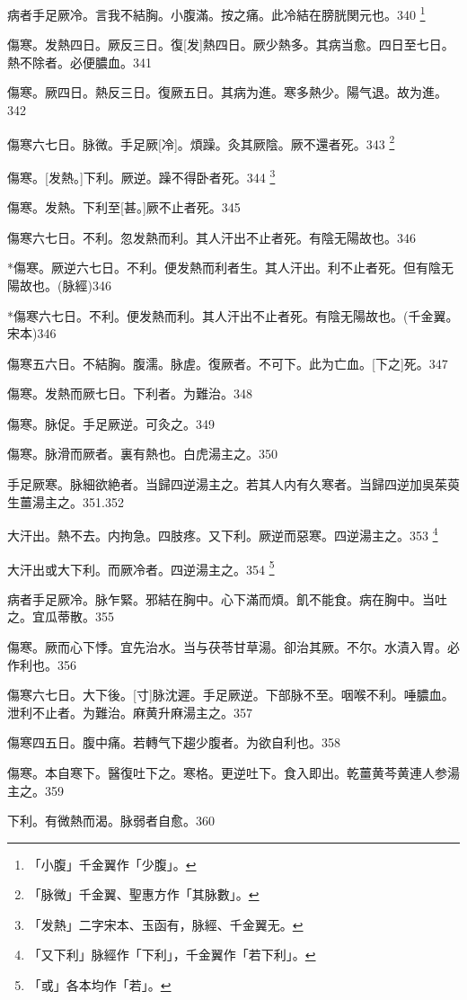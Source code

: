 \documentclass[12pt,twoside,UTF8,b5paper]{ctexbook}
\begin{document}
病者手足厥冷。言我不結胸。小腹滿。按之痛。此冷結在膀胱関元也。340
	\footnote{「小腹」千金翼作「少腹」。}

傷寒。发熱四日。厥反三日。復[发]熱四日。厥少熱多。其病当愈。四日至七日。熱不除者。必便膿血。341

傷寒。厥四日。熱反三日。復厥五日。其病为進。寒多熱少。陽气退。故为進。342

傷寒六七日。脉微。手足厥[冷]。煩躁。灸其厥陰。厥不還者死。343
	\footnote{「脉微」千金翼、聖惠方作「其脉數」。}

傷寒。[发熱。]下利。厥逆。躁不得卧者死。344
	\footnote{「发熱」二字宋本、玉函有，脉經、千金翼无。}

傷寒。发熱。下利至[甚。]厥不止者死。345

傷寒六七日。不利。忽发熱而利。其人汗出不止者死。有陰无陽故也。346

*傷寒。厥逆六七日。不利。便发熱而利者生。其人汗出。利不止者死。但有陰无陽故也。(脉經)346

*傷寒六七日。不利。便发熱而利。其人汗出不止者死。有陰无陽故也。(千金翼。宋本)346

傷寒五六日。不結胸。腹濡。脉虗。復厥者。不可下。此为亡血。[下之]死。347

傷寒。发熱而厥七日。下利者。为難治。348

傷寒。脉促。手足厥逆。可灸之。349

傷寒。脉滑而厥者。裏有熱也。白虎湯主之。350

手足厥寒。脉細欲絶者。当歸四逆湯主之。若其人内有久寒者。当歸四逆加吳茱萸生薑湯主之。351.352

大汗出。熱不去。内拘急。四肢疼。又下利。厥逆而惡寒。四逆湯主之。353
	\footnote{「又下利」脉經作「下利」，千金翼作「若下利」。}

大汗出或大下利。而厥冷者。四逆湯主之。354
	\footnote{「或」各本均作「若」。}

病者手足厥冷。脉乍緊。邪結在胸中。心下滿而煩。飢不能食。病在胸中。当吐之。宜瓜蒂散。355

傷寒。厥而心下悸。宜先治水。当与茯苓甘草湯。卻治其厥。不尔。水漬入胃。必作利也。356

傷寒六七日。大下後。[寸]脉沈遲。手足厥逆。下部脉不至。咽喉不利。唾膿血。泄利不止者。为難治。麻黄升麻湯主之。357

傷寒四五日。腹中痛。若轉气下趨少腹者。为欲自利也。358

傷寒。本自寒下。醫復吐下之。寒格。更逆吐下。食入即出。乾薑黄芩黄連人参湯主之。359

下利。有微熱而渴。脉弱者自愈。360
\end{document}
